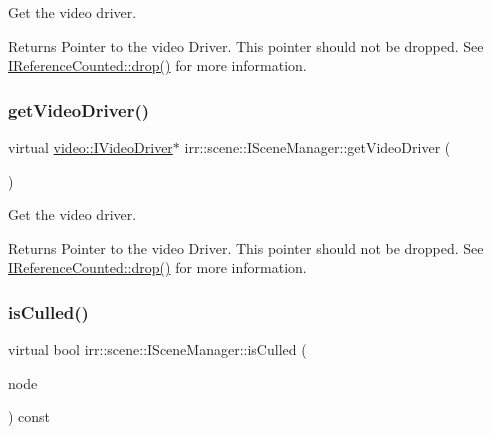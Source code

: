 Get the video driver. 

\begin{DoxyReturn}{Returns}
Pointer to the video Driver. This pointer should not be dropped. See \hyperlink{classirr_1_1IReferenceCounted_a03856a09355b89d178090c4a5f738543}{I\+Reference\+Counted\+::drop()} for more information. 
\end{DoxyReturn}
\mbox{\label{classirr_1_1scene_1_1ISceneManager_afde082160205a8faab44cd5b61e3745c}} 
\subsubsection{\texorpdfstring{get\+Video\+Driver()}{getVideoDriver()}\hspace{0.1cm}{\footnotesize\ttfamily [2/2]}}
{\footnotesize\ttfamily virtual \hyperlink{classirr_1_1video_1_1IVideoDriver}{video\+::\+I\+Video\+Driver}$\ast$ irr\+::scene\+::\+I\+Scene\+Manager\+::get\+Video\+Driver (\begin{DoxyParamCaption}{ }\end{DoxyParamCaption})\hspace{0.3cm}{\ttfamily [pure virtual]}}



Get the video driver. 

\begin{DoxyReturn}{Returns}
Pointer to the video Driver. This pointer should not be dropped. See \hyperlink{classirr_1_1IReferenceCounted_a03856a09355b89d178090c4a5f738543}{I\+Reference\+Counted\+::drop()} for more information. 
\end{DoxyReturn}
\mbox{\label{classirr_1_1scene_1_1ISceneManager_aff6c6d553e0faf12bbfd33e814ad4352}} 
\subsubsection{\texorpdfstring{is\+Culled()}{isCulled()}\hspace{0.1cm}{\footnotesize\ttfamily [1/2]}}
{\footnotesize\ttfamily virtual bool irr\+::scene\+::\+I\+Scene\+Manager\+::is\+Culled (\begin{DoxyParamCaption}\item[{const \hyperlink{classirr_1_1scene_1_1ISceneNode}{I\+Scene\+Node} $\ast$}]{node }\end{DoxyParamCaption}) const\hspace{0.3cm}{\ttfamily [pure virtual]}}



